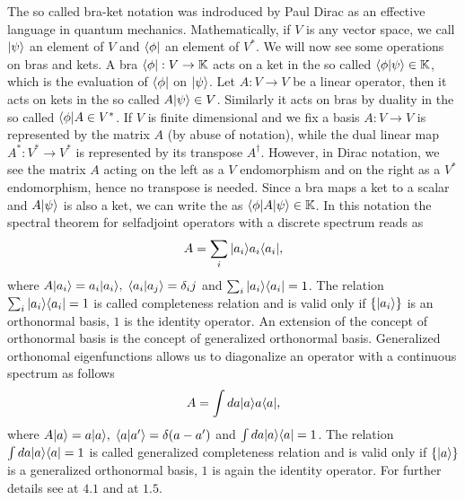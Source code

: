 \documentclass[../1.tex]{subfiles}
\begin{document}
   
    The so called bra-ket notation was indroduced by Paul Dirac as an effective language in quantum mechanics.
    Mathematically, if $V$ is any vector space, we call  $| \psi \rangle$ an element of $V$ and  $\langle \phi |$ an element of $V^*$.
    We will now see some operations on bras and kets.
    A bra $\langle \phi | : V \to \mathbb{K}$ acts on a ket in the so called  $\langle \phi | \psi \rangle \in \mathbb{K}$, which is the evaluation of
    $\langle \phi |$ on $| \psi \rangle$.
    Let $A : V \to V$ be a linear operator, then it acts on kets in the so called  $A| \psi \rangle \in V$.
    Similarly it acts on bras by duality in the so called  $\langle \phi |A \in V^*$.
    If $V$ is finite dimensional and we fix a basis $A: V \to V$ is represented by the matrix $A$ (by abuse of notation),
    while the dual linear map $A^* : V^* \to V^*$ is represented by its transpose $A^\dagger$.
    However, in Dirac notation, we see the matrix $A$ acting on the left as a $V$ endomorphism and on the right as a $V^*$ endomorphism,
    hence no transpose is needed.
    Since a bra maps a ket to a scalar and $A| \psi \rangle$ is also a ket, we can write the  as $\langle \phi |A| \psi \rangle \in \mathbb{K}$.
    In this notation the spectral theorem for selfadjoint operators with a discrete spectrum reads as
    \[ A = \sum_i | a_i \rangle a_i\langle a_i |, \]
    where $A | a_i \rangle = a_i | a_i \rangle, \; \langle a_i | a_j \rangle = \delta_ij$ and $\sum_i | a_i \rangle \langle a_i | = 1$.
    The relation $\sum_i | a_i \rangle \langle a_i | = 1$ is called completeness relation and
    is valid only if $\{ | a_i \rangle\}$ is an orthonormal basis, $1$ is the identity operator.
    An extension of the concept of orthonormal basis is the concept of generalized orthonormal basis.
    Generalized orthonomal eigenfunctions allows us to diagonalize an operator with a continuous spectrum as follows
    \[ A = \int da | a \rangle a\langle a |, \]
    where $A | a \rangle = a| a \rangle, \; \langle a | a' \rangle = \delta(a-a')$ and $\int da | a \rangle \langle a | = 1$.
    The relation $\int da | a \rangle \langle a | = 1$ is called generalized completeness relation and
    is valid only if $\{ | a \rangle\}$ is a generalized orthonormal basis, $1$ is again the identity operator.
    For further details see \cite{axqft} at $4.1$ and at $1.5$.
\end{document}

